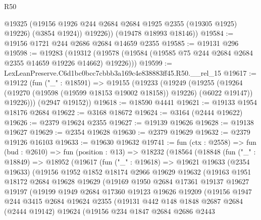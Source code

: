 \begin{lexlean}{R50}
\begin{coremodule}
            @19325
            (@19156 @1926 @244 @2684 @2684 @1925 @2355 (@19305 @1925) @19226)
            (@3854 @1924))
          @19226))
      (@19478 @18993 @18146))
@19584 := @19156 @1721 @244 @2686 @2684 @14659 @2355
@19585 := @19131 @296
@19598 := @19283
    (@19312 (@19578 (@19584 (@19585 @75 @244 @2684 @2684 @2355 @14659 @19226 @14662) @19226)))
@19599 := LexLeanPreserve.C6d1bc0bcc7cbbb3a169c4e838883ff45.R50.__rel_15
@19617 := @19122
    (fun ("_" : @18591) =>
    @19155
      (@19233
        (@19249
          (@19255
            (@19264 (@19270 (@19598 (@19599 @18153 @19002 @18158)) @19226) (@6022 @19147))
            @19226)))
      (@2947 @19152))
@19618 := @18590 @4441
@19621 := @19133 @1954 @18176 @2684
@19622 := @3168 @18672
@19624 := @3164 (@2444 @19622)
@19626 := @2379 @19624 @2355
@19627 := @19139 @19626
@19628 := @19138 @19627
@19629 := @2354 @19628
@19630 := @2379 @19629
@19632 := @2379 @19126 @16103
@19633 := @19630 @19632
@19741 := fun (ctx : @2558) =>
  fun (bud : @2610) =>
  fun (position : @13) =>
  @18232
    (@18564
      (@18848
        (fun ("_" : @18849) =>
        @18952
          (@19617
            (fun ("_" : @19618) =>
            @19621
              @19633
              (@2354 @19633)
              (@19156
                @1952
                @1852
                @18174
                @2966
                @19629
                @19632
                (@19163
                  @1951
                  @18172
                  @2684
                  @19628
                  @19629
                  (@19169
                    @1950
                    @2684
                    @17361
                    @19137
                    @19627
                    @19197
                    (@19199
                      @1949
                      @2684
                      @17360
                      @19123
                      @19626
                      @19209
                      (@19156
                        @1947
                        @244
                        @3415
                        @2684
                        @19624
                        @2355
                        (@19131
                          @442
                          @148
                          @1848
                          @2687
                          @2684
                          (@2444 @19142)
                          @19624
                          (@19156
                            @234
                            @1847
                            @2684
                            @2686
                            @2443

\end{coremodule}
\end{lexlean}
